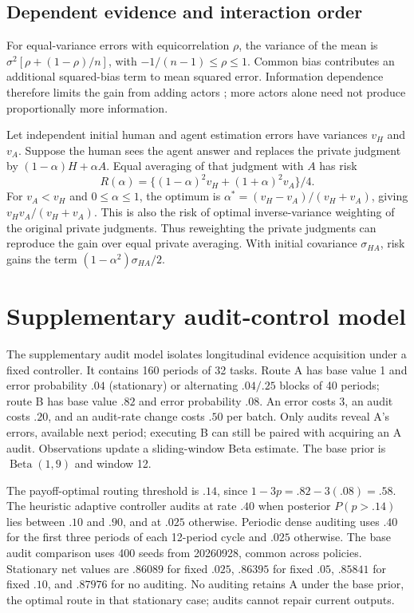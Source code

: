 \subsection{Dependent evidence and interaction order}
For equal-variance errors with equicorrelation $\rho$, the variance of the mean is $\sigma^2[\rho+(1-\rho)/n]$, with $-1/(n-1)\leq\rho\leq1$. Common bias contributes an additional squared-bias term to mean squared error. Information dependence therefore limits the gain from adding actors \citep{clemen}; more actors alone need not produce proportionally more information.

Let independent initial human and agent estimation errors have variances $v_H$ and $v_A$. Suppose the human sees the agent answer and replaces the private judgment by $(1-\alpha)H+\alpha A$. Equal averaging of that judgment with $A$ has risk
\begin{equation}
R(\alpha)=\{(1-\alpha)^2v_H+(1+\alpha)^2v_A\}/4.
\end{equation}
For $v_A<v_H$ and $0\leq\alpha\leq1$, the optimum is $\alpha^*=(v_H-v_A)/(v_H+v_A)$, giving $v_Hv_A/(v_H+v_A)$. This is also the risk of optimal inverse-variance weighting of the original private judgments. Thus reweighting the private judgments can reproduce the gain over equal private averaging. With initial covariance $\sigma_{HA}$, risk gains the term $(1-\alpha^2)\sigma_{HA}/2$.



\section{Supplementary audit-control model}
\label{app:audit}
The supplementary audit model isolates longitudinal evidence acquisition under a fixed controller. It contains 160 periods of 32 tasks. Route A has base value 1 and error probability $.04$ (stationary) or alternating $.04/.25$ blocks of 40 periods; route B has base value $.82$ and error probability $.08$. An error costs 3, an audit costs $.20$, and an audit-rate change costs $.50$ per batch. Only audits reveal A's errors, available next period; executing B can still be paired with acquiring an A audit. Observations update a sliding-window Beta estimate. The base prior is $\operatorname{Beta}(1,9)$ and window 12.

The payoff-optimal routing threshold is $.14$, since $1-3p=.82-3(.08)=.58$. The heuristic adaptive controller audits at rate $.40$ when posterior $P(p>.14)$ lies between $.10$ and $.90$, and at $.025$ otherwise. Periodic dense auditing uses $.40$ for the first three periods of each 12-period cycle and $.025$ otherwise. The base audit comparison uses 400 seeds from 20260928, common across policies. Stationary net values are $.86089$ for fixed $.025$, $.86395$ for fixed $.05$, $.85841$ for fixed $.10$, and $.87976$ for no auditing. No auditing retains A under the base prior, the optimal route in that stationary case; audits cannot repair current outputs.

